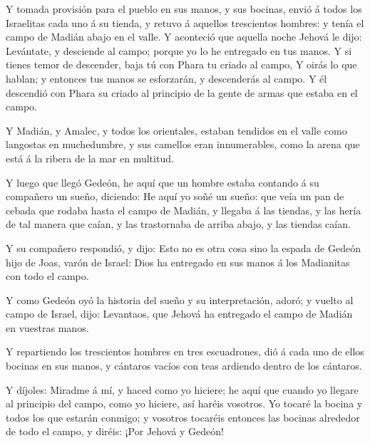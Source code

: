  Y tomada provisión para el pueblo en sus manos, y sus
bocinas, envió á todos los Israelitas cada uno á su tienda, y retuvo á
aquellos trescientos hombres: y tenía el campo de Madián abajo en el
valle.  Y aconteció que aquella noche Jehová le dijo:
Levántate, y desciende al campo; porque yo lo he entregado en tus manos.
 Y si tienes temor de descender, baja tú con Phara tu
criado al campo,  Y oirás lo que hablan; y entonces tus
manos se esforzarán, y descenderás al campo. Y él descendió con Phara su
criado al principio de la gente de armas que estaba en el campo.

 Y Madián, y Amalec, y todos los orientales, estaban
tendidos en el valle como langostas en muchedumbre, y sus camellos eran
innumerables, como la arena que está á la ribera de la mar en multitud.

 Y luego que llegó Gedeón, he aquí que un hombre estaba
contando á su compañero un sueño, diciendo: He aquí yo soñé un sueño:
que veía un pan de cebada que rodaba hasta el campo de Madián, y llegaba
á las tiendas, y las hería de tal manera que caían, y las trastornaba de
arriba abajo, y las tiendas caían.

 Y su compañero respondió, y dijo: Esto no es otra cosa
sino la espada de Gedeón hijo de Joas, varón de Israel: Dios ha
entregado en sus manos á los Madianitas con todo el campo.

 Y como Gedeón oyó la historia del sueño y su
interpretación, adoró; y vuelto al campo de Israel, dijo: Levantaos, que
Jehová ha entregado el campo de Madián en vuestras manos.

 Y repartiendo los trescientos hombres en tres escuadrones,
dió á cada uno de ellos bocinas en sus manos, y cántaros vacíos con teas
ardiendo dentro de los cántaros.

 Y díjoles: Miradme á mí, y haced como yo hiciere; he aquí
que cuando yo llegare al principio del campo, como yo hiciere, así
haréis vosotros.  Yo tocaré la bocina y todos los que
estarán conmigo; y vosotros tocaréis entonces las bocinas alrededor de
todo el campo, y diréis: ¡Por Jehová y Gedeón!

